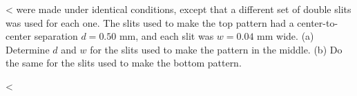 <%
were made under identical conditions, except that a
different set of double slits was used for each one. The
slits used to make the top pattern had a center-to-center
separation $d=0.50$ mm, and each slit was $w=0.04$ mm wide.
(a) Determine $d$ and $w$ for the slits used to make the
pattern in the middle. (b) Do the same for the slits used to
make the bottom pattern.

<%
